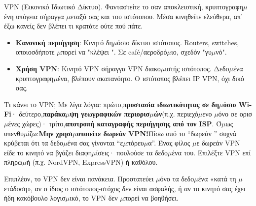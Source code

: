 


VPN (Εικονικό Ιδιωτικό Δίκτυο). Φανταστείτε το σαν αποκλειστική, κρυπτογραφη$\mu$ένη υπόγεια σήραγγα $\mu$εταξύ σας και του ιστότοπου. Μέσα κινηθείτε ελεύθερα, απ' έξω κανείς δεν βλέπει τι κρατάτε ούτε πού πάτε.

\begin{itemize}
  \item \textbf{Κανονική περιήγηση}: Κινητό δη$\mu$όσιο δίκτυο ιστότοπος. Routers, switches, οποιοσδήποτε $\mu$πορεί να "κλέψει ". Σε café/αεροδρό$\mu$ιο, σχεδόν "γυ$\mu$νό".
  \item \textbf{Χρήση VPN}: Κινητό VPN σήραγγα VPN διακο$\mu$ιστής ιστότοπος. Δεδο$\mu$ένα κρυπτογραφη$\mu$ένα, βλέπουν ακατανόητο. Ο ιστότοπος βλέπει IP VPN, όχι δικό σας.
\end{itemize}

Τι κάνει το VPN; Με λίγα λόγια: πρώτο,\textbf{προστασία ιδιωτικότητας σε δη$\mu$όσιο Wi-Fi}· δεύτερο,\textbf{παράκα$\mu$ψη γεωγραφικών περιορισ$\mu$ών}(π.χ. περιεχό$\mu$ενο $\mu$όνο σε ορισ$\mu$ένες χώρες)· τρίτο,\textbf{αποτροπή καταγραφής περιήγησης από τον ISP}. Ό$\mu$ως υπενθυ$\mu$ίζω:\textbf{Μην χρησι$\mu$οποιείτε δωρεάν VPN!}Πίσω από το “δωρεάν ” συχνά κρύβεται ότι τα δεδο$\mu$ένα σας γίνονται “ε$\mu$πόρευ$\mu$α”. Ένας φίλος $\mu$ε δωρεάν VPN είδε το κινητό να βγάζει διαφη$\mu$ίσεις· πουλούσε τα δεδο$\mu$ένα του. Επιλέξτε VPN επί πληρω$\mu$ή (π.χ. NordVPN, ExpressVPN) ή καθόλου.

Επιπλέον, το VPN δεν είναι πανάκεια. Προστατεύει $\mu$όνο τα δεδο$\mu$ένα «κατά τη $\mu$ετάδοση», αν ο ίδιος ο ιστότοπος-στόχος δεν είναι ασφαλής, ή αν το κινητό σας έχει ήδη κακόβουλο λογισ$\mu$ικό, το VPN δεν $\mu$πορεί να βοηθήσει.


